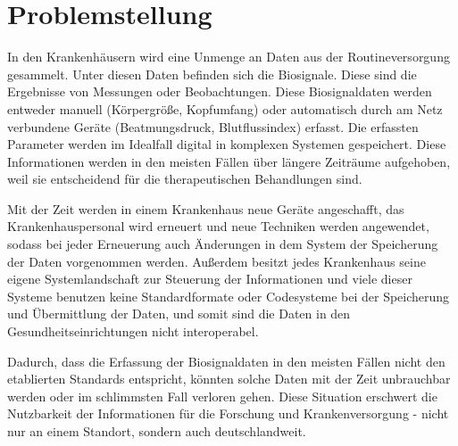 \section{Problemstellung} \label{sec:problem}

In den Krankenhäusern wird eine Unmenge an Daten aus der Routineversorgung gesammelt. Unter diesen Daten befinden sich die Biosignale. Diese sind die Ergebnisse von Messungen oder Beobachtungen. Diese Biosignaldaten werden entweder manuell (Körpergröße, Kopfumfang) oder automatisch durch am Netz verbundene Geräte (Beatmungsdruck, Blutflussindex) erfasst. Die erfassten Parameter werden im Idealfall digital in komplexen Systemen gespeichert. Diese Informationen werden in den meisten Fällen über längere Zeiträume aufgehoben, weil sie entscheidend für die therapeutischen Behandlungen sind. 

Mit der Zeit werden in einem Krankenhaus neue Geräte angeschafft, das Krankenhauspersonal wird erneuert und neue Techniken werden angewendet, sodass bei jeder Erneuerung auch Änderungen in dem System der Speicherung der Daten vorgenommen werden. Außerdem besitzt jedes Krankenhaus seine eigene Systemlandschaft zur Steuerung der Informationen und viele dieser Systeme benutzen keine Standardformate oder Codesysteme bei der Speicherung und Übermittlung der Daten, und somit sind die Daten in den Gesundheitseinrichtungen nicht interoperabel. 

Dadurch, dass die Erfassung der Biosignaldaten in den meisten Fällen nicht den etablierten Standards entspricht, könnten solche Daten mit der Zeit unbrauchbar werden oder im schlimmsten Fall verloren gehen. Diese Situation erschwert die Nutzbarkeit der Informationen für die Forschung und Krankenversorgung - nicht nur an einem Standort, sondern auch deutschlandweit.